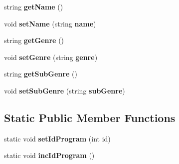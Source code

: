 \begin{CompactItemize}
\item 
string \textbf{getName} ()\label{classbr_1_1ufscar_1_1lince_1_1ginga_1_1recommender_1_1Program_11335e13e50af74108bf926dc1340b4b}

\item 
void \textbf{setName} (string {\bf name})\label{classbr_1_1ufscar_1_1lince_1_1ginga_1_1recommender_1_1Program_4eaf7a54a9d929af6602c086d9dfb4a5}

\item 
string \textbf{getGenre} ()\label{classbr_1_1ufscar_1_1lince_1_1ginga_1_1recommender_1_1Program_40c0b5b739cb61b28a061be09b94ff19}

\item 
void \textbf{setGenre} (string {\bf genre})\label{classbr_1_1ufscar_1_1lince_1_1ginga_1_1recommender_1_1Program_2db428cf5aab3d6c221208cc35e2efd8}

\item 
string \textbf{getSubGenre} ()\label{classbr_1_1ufscar_1_1lince_1_1ginga_1_1recommender_1_1Program_e5ed7b8bdcca6a49ea72f90c23ffcecd}

\item 
void \textbf{setSubGenre} (string {\bf subGenre})\label{classbr_1_1ufscar_1_1lince_1_1ginga_1_1recommender_1_1Program_a4bc24b37861bcff8e56013ded551945}

\end{CompactItemize}
\subsection*{Static Public Member Functions}
\begin{CompactItemize}
\item 
static void \textbf{setIdProgram} (int id)\label{classbr_1_1ufscar_1_1lince_1_1ginga_1_1recommender_1_1Program_32f957af9abf1ab1958a83502d8636fc}

\item 
static void \textbf{incIdProgram} ()\label{classbr_1_1ufscar_1_1lince_1_1ginga_1_1recommender_1_1Program_3c7804c19586dd5122d76483ea8f5032}

\end{CompactItemize}
